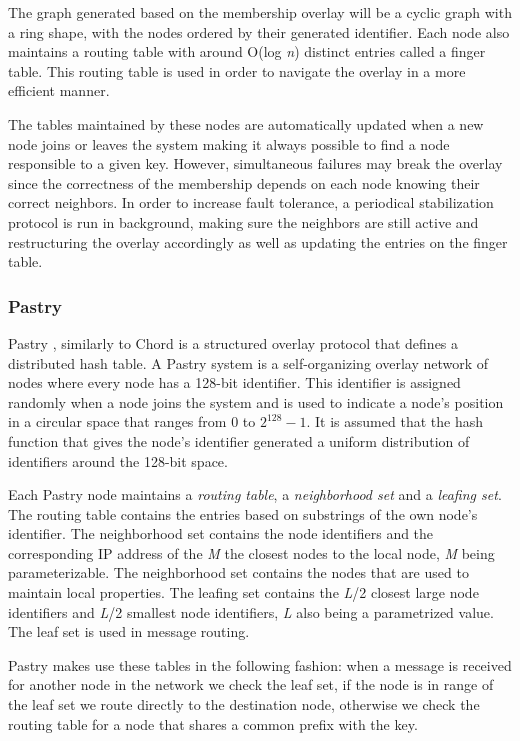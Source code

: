 The graph generated based on the membership overlay will be a cyclic graph with
a ring shape, with the nodes ordered by their generated identifier. Each node
also maintains a routing table with around O(log \textit{n}) distinct entries
called a finger table. This routing table is used in order to navigate the overlay
in a more efficient manner.

The tables maintained by these nodes are automatically updated when a new node joins
or leaves the system  making it always possible to find a node responsible to a given
key. However, simultaneous failures may break the overlay since the correctness
of the membership depends on each node knowing their correct neighbors. In order
to increase fault tolerance, a periodical stabilization protocol is run in background,
making sure the neighbors are still active and restructuring the overlay
accordingly as well as updating the entries on the finger table.

\subsubsection{Pastry}
\label{subsec:pastry}

Pastry \cite{pastry}, similarly to Chord is a structured overlay protocol that
defines a distributed hash table. A Pastry system is a self-organizing overlay
network of nodes where every node has a 128-bit identifier. This identifier
is assigned randomly when a node joins the system and is used to indicate a
node's position in a circular space that ranges from 0 to $2^{128}-1$. It is assumed
that the hash function that gives the node's identifier generated a uniform
distribution of identifiers around the 128-bit space.

Each Pastry node maintains a \textit{routing table}, a \textit{neighborhood set}
and a \textit{leafing set}. The routing table contains the entries based
on substrings of the own node's identifier. The neighborhood set contains
the node identifiers and the corresponding IP address of the \textit{M} the closest
nodes to the local node, \textit{M} being parameterizable.  The neighborhood
set contains the nodes that are used to maintain local properties. The leafing
set contains the \textit{L}/2 closest large node identifiers and \textit{L}/2
smallest node identifiers, \textit{L} also being a parametrized value. The
leaf set is used in message routing.

Pastry makes use these tables in the following fashion: when a message is received
for another node in the network we check the leaf set, if the node is in range of
the leaf set we route directly to the destination node, otherwise we check
the routing table for a node that shares a common prefix with the key.

